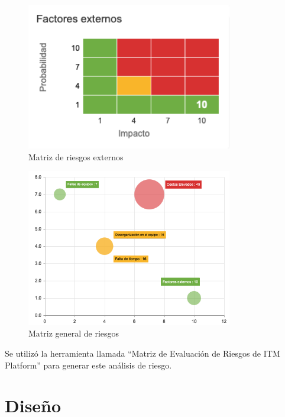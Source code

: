 \documentclass[12pt, a4paper, titlepage]{report}
\begin{document}
\begin{itemize}
	    	\begin{figure}[H]
	    		\includegraphics[width=9cm]{./imagenes/Analisis/AnalisisRiesgo/Externos.png}
	    		\centering 
	    		\caption{Matriz de riesgos externos}
	    	\end{figure}
	    	
    	\end{itemize}
    
    	\begin{figure}[H]
    		\includegraphics[width=9cm]{./imagenes/Analisis/AnalisisRiesgo/analisisriesgos.png}
    		\centering 
    		\caption{Matriz general de riesgos}
    	\end{figure}
    
    	Se utilizó la herramienta llamada ``Matriz de Evaluación de Riesgos de ITM Platform'' para generar este análisis de riesgo. \cite{refMatrizEvaluacionRiesgos}
\newpage

\chapter{\textcolor{azulescom}{Diseño}}

\end{document}
